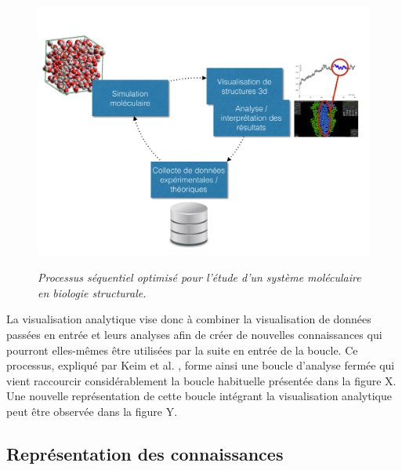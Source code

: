 \begin{figure}
  \centering
  {\includegraphics[width=.75\linewidth]{./figures/ch4/ch4_structural_biology_optim.pdf}}
    \caption{{\it Processus séquentiel optimisé pour l'étude d'un système moléculaire en biologie structurale.}}
  \label{Fig:schema_seq_bio_optim}
  \hspace{0.3cm}
\end{figure}

La visualisation analytique vise donc à combiner la visualisation de données passées en entrée et leurs analyses afin de créer de nouvelles connaissances qui pourront elles-mêmes être utilisées par la suite en entrée de la boucle. Ce processus, expliqué par Keim et al. \cite{keim2010mastering}, forme ainsi une boucle d'analyse fermée qui vient raccourcir considérablement la boucle habituelle présentée dans la figure X. Une nouvelle représentation de cette boucle intégrant la visualisation analytique peut être observée dans la figure Y.

\subsection{Représentation des connaissances}

